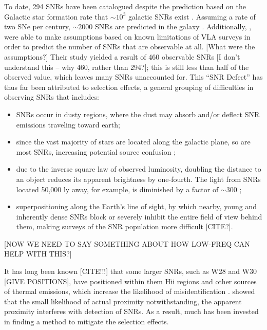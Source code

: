 \documentclass[useAMS,usenatbib]{mn2e}
\begin{document}
To date, 294 SNRs have been catalogued \citep{DAGreen.14} despite the prediction based on the Galactic star formation rate that $\sim10^3$ galactic SNRs exist \citep{Li.91}.  
Assuming a rate of two SNe per century, $\sim2000$ SNRs are predicted in the galaxy \citep{Pavlovic.13}.  
Additionally, \cite{Brogan.06}, were able to make assumptions based on known limitations of VLA surveys in order to predict the number of SNRs that are observable at all. {\color{red}[What were the assumptions?]}
Their study yielded a result of 460 observable SNRs {\color{red}[I don't understand this -- why 460, rather than 294?]}; this is still less than half of the observed value, which leaves many SNRs unaccounted for. 
This “SNR Defect” has thus far been attributed to selection effects, a general grouping of difficulties in observing SNRs that includes: 
\begin{itemize}
\item[(i)] SNRs occur in dusty regions, where the dust may absorb and/or deflect SNR emissions traveling toward earth;
\item[(ii)] since the vast majority of stars are located along the galactic plane, so are most SNRs, increasing potential source confusion \citep[e.g.][]{Gao_v.11,Gao_vi.11};
\item[(iii)] due to the inverse square law of observed luminosity, doubling the distance to an object reduces its apparent brightness by one-fourth. The light from SNRs located 50,000 ly away, for example, is diminished by a factor of $\sim$300  \citep{Green.91};
\item[(iv)] superpositioning along the Earth’s line of sight, by which nearby, young  and inherently dense SNRs block or severely inhibit the entire field of view behind them, making surveys of the SNR population more difficult {\color{red}[CITE?]}. 
\end{itemize}
{\color{red}[NOW WE NEED TO SAY SOMETHING ABOUT HOW LOW-FREQ CAN HELP WITH THIS?]}

It has long been known {\color{red}[CITE!!!]} that some larger SNRs, such as W28 and W30 {\color{red}[GIVE POSITIONS]}, have positioned within them H{\sc ii} regions and other sources of thermal emissions, which increase the likelihood of misidentification \citep{Andrews.85}.  \cite{Brogan.06} showed that the small likelihood of actual proximity notwithstanding, the apparent proximity interferes with detection of SNRs.  As a result, much has been invested in finding a method to mitigate the selection effects. 
\end{document}

